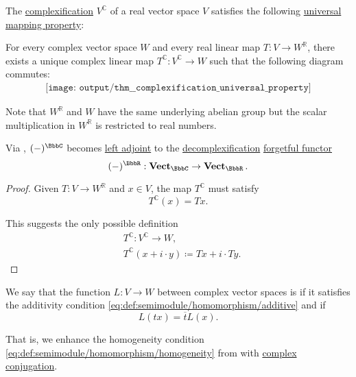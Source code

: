 \begin{theorem}\label{thm:complexification_universal_property}
  The \hyperref[def:complexification]{complexification} \( V^\BbbC \) of a real vector space \( V \) satisfies the following \hyperref[rem:universal_mapping_property]{universal mapping property}:
  \begin{displayquote}
    For every complex vector space \( W \) and every real linear map \( T: V \to W^\BbbR \), there exists a unique complex linear map \( T^\BbbC: V^\BbbC \to W \) such that the following diagram commutes:
    \begin{equation}\label{eq:thm:complexification_universal_property/diagram}
      \begin{aligned}
        \texttt{[image: output/thm\_\_complexification\_universal\_property]}
      \end{aligned}
    \end{equation}
  \end{displayquote}

  Note that \( W^\BbbR \) and \( W \) have the same underlying abelian group but the scalar multiplication in \( W^\BbbR \) is restricted to real numbers.

  Via , \( (\anon*)^\BbbC \) becomes \hyperref[def:category_adjunction]{left adjoint} to the \hyperref[def:complexification]{decomplexification} \hyperref[def:concrete_category]{forgetful functor}
  \begin{equation*}
    (\anon*)^\BbbR: \cat{Vect}_\BbbC \to \cat{Vect}_\BbbR.
  \end{equation*}
\end{theorem}
\begin{proof}
  Given \( T: V \to W^\BbbR \) and \( x \in V \), the map \( T^\BbbC \) must satisfy
  \begin{equation*}
    T^\BbbC(x) = Tx.
  \end{equation*}

  This suggests the only possible definition
  \begin{equation*}
    \begin{aligned}
      &T^\BbbC: V^\BbbC \to W, \\
      &T^\BbbC(x + i \cdot y) \coloneqq Tx + i \cdot Ty.
    \end{aligned}
  \end{equation*}
\end{proof}

\begin{definition}\label{def:antilinear_function}\mimprovised
  We say that the function \( L: V \to W \) between complex vector spaces is  if it satisfies the additivity condition \eqref{eq:def:semimodule/homomorphism/additive} and if
  \begin{equation}\label{eq:def:antilinear_function}
    L(tx) = \overline t L(x).
  \end{equation}

  That is, we enhance the homogeneity condition \eqref{eq:def:semimodule/homomorphism/homogeneity} from  with \hyperref[def:complex_numbers]{complex conjugation}.
\end{definition}


